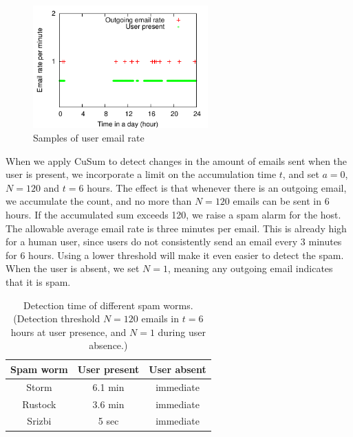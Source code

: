 \begin{figure}[htb]
\begin{center}
\includegraphics[width=0.6\textwidth]{sensor/email-norm}
\caption{Samples of user email rate}
\label{fig:email}
\end{center}
\end{figure}

When we apply CuSum to detect changes in the amount of emails sent when
the user is present, we incorporate a limit on the accumulation time
$t$, and set $a=0$, $N=120$ and $t=6$ hours. The effect is that
whenever there is an outgoing email, we accumulate the count, and no
more than $N=120$ emails can be sent in 6 hours. If the accumulated sum
exceeds 120, we raise a spam alarm for the host. The allowable
average email rate is three minutes per email. This is already high for a
human user, since users do not consistently send an email every 3
minutes for 6 hours. Using a lower threshold will make it even easier
to detect the spam.
When the user is absent, we set $N=1$, meaning any
outgoing email indicates that it is spam.


\begin{table}[!t]
  \centering
  \begin{tabular}{|c|c|c|}
  \hline
  Spam worm  & User present & User absent \\
  \hline
  Storm & 6.1 min & immediate \\
  \hline
  Rustock & 3.6 min & immediate \\
  \hline
  Srizbi & 5 sec & immediate \\ [0.5ex]
  \hline
  \end{tabular}
  \caption{Detection time of different spam worms. (Detection threshold $N=120$ emails in $t=6$ hours at user presence, and $N=1$ during user absence.)}
  \label{tbl:detect-spam}
\end{table}

